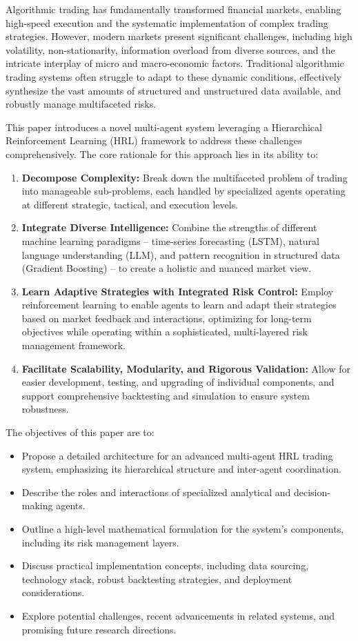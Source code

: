 \documentclass[11pt,a4paper]{article}
\begin{document}
Algorithmic trading has fundamentally transformed financial markets, enabling high-speed execution and the systematic implementation of complex trading strategies. However, modern markets present significant challenges, including high volatility, non-stationarity, information overload from diverse sources, and the intricate interplay of micro and macro-economic factors. Traditional algorithmic trading systems often struggle to adapt to these dynamic conditions, effectively synthesize the vast amounts of structured and unstructured data available, and robustly manage multifaceted risks.

This paper introduces a novel multi-agent system leveraging a Hierarchical Reinforcement Learning (HRL) framework to address these challenges comprehensively. The core rationale for this approach lies in its ability to:
\begin{enumerate}
\item  \textbf{Decompose Complexity:} Break down the multifaceted problem of trading into manageable sub-problems, each handled by specialized agents operating at different strategic, tactical, and execution levels.
\item  \textbf{Integrate Diverse Intelligence:} Combine the strengths of different machine learning paradigms – time-series forecasting (LSTM), natural language understanding (LLM), and pattern recognition in structured data (Gradient Boosting) – to create a holistic and nuanced market view.
\item  \textbf{Learn Adaptive Strategies with Integrated Risk Control:} Employ reinforcement learning to enable agents to learn and adapt their strategies based on market feedback and interactions, optimizing for long-term objectives while operating within a sophisticated, multi-layered risk management framework.
\item  \textbf{Facilitate Scalability, Modularity, and Rigorous Validation:} Allow for easier development, testing, and upgrading of individual components, and support comprehensive backtesting and simulation to ensure system robustness.

\end{enumerate}
The objectives of this paper are to:
\begin{itemize}
\item   Propose a detailed architecture for an advanced multi-agent HRL trading system, emphasizing its hierarchical structure and inter-agent coordination.
\item   Describe the roles and interactions of specialized analytical and decision-making agents.
\item   Outline a high-level mathematical formulation for the system's components, including its risk management layers.
\item   Discuss practical implementation concepts, including data sourcing, technology stack, robust backtesting strategies, and deployment considerations.
\item   Explore potential challenges, recent advancements in related systems, and promising future research directions.

\end{itemize}
\end{document}
